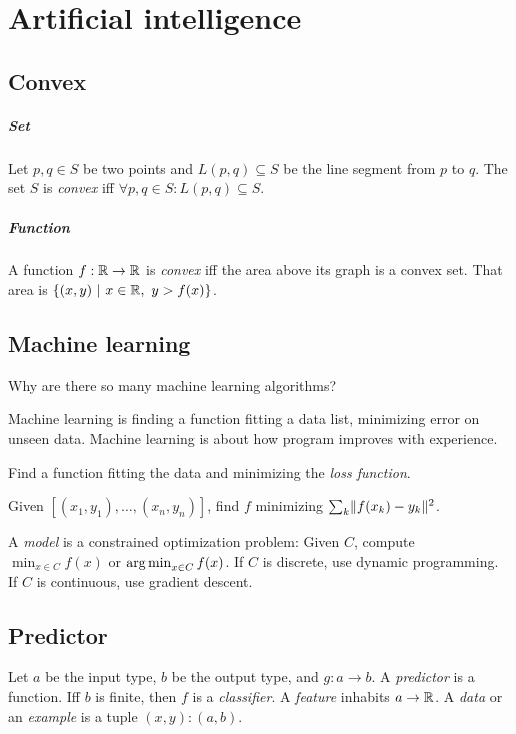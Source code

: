 \chapter{Artificial intelligence}

\section{Convex}

\paragraph{Set}
Let \(p, q \in S\) be two points
and \(L(p,q) \subseteq S\) be the line segment from \(p\) to \(q\).
The set \(S\) is
%
\emph{convex} iff \(\forall p,q \in S : L(p,q) \subseteq S\).

\paragraph{Function}
A function \(f : \mathbb{R} \to \mathbb{R}\) is
%
\emph{convex}
iff the area above its graph is a convex set.
That area is \(\{(x,y) ~|~ x \in \mathbb{R}, ~ y > f(x)\}\).

\section{Machine learning}

Why are there so many machine learning algorithms?

Machine learning is finding a function fitting a data list,
minimizing error on unseen data.
Machine learning is about how program improves with experience.

Find a function fitting the data and minimizing the
%
\emph{loss function}.

Given \([(x_1,y_1),\ldots,(x_n,y_n)]\),
find \(f\) minimizing \(\sum_k \lVert f(x_k) - y_k\rVert^2\).

A
%
\emph{model} is a constrained optimization problem:
Given \(C\),
compute \(\min_{x \in C} f(x)\) or \(\operatorname{arg\,min}_{x \in C} f(x)\).
If \(C\) is discrete, use dynamic programming.
If \(C\) is continuous, use gradient descent.

\section{Predictor}

Let \(a\) be the input type, \(b\) be the output type, and \(g : a \to b\).
A
%
\emph{predictor} is a function.
Iff \(b\) is finite, then \(f\) is a
%
\emph{classifier}.
A
%
\emph{feature} inhabits \(a \to \mathbb{R}\).
A
%
\emph{data} or an
%
\emph{example}
is a tuple \((x,y) : (a,b)\).

